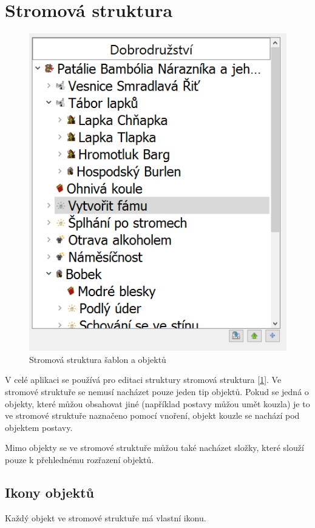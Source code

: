 \documentclass[12pt,a4paper,oneside]{article}
\begin{document}
\section{Stromová struktura}	
	\begin{figure}[h]
  		\centering  		
    		\includegraphics[width=0.8\linewidth]{images/editace_strom}
    		\caption{Stromová struktura šablon a objektů}
    		\label{fig:editace_strom}  	  		
  		\vfill
	\end{figure}	

V celé aplikaci se používá pro editaci struktury stromová struktura [\ref{fig:editace_strom}]. Ve stromové struktuře se nemusí nacházet pouze jeden tip objektů. Pokud se jedná o objekty, které můžou obsahovat jiné (například postavy můžou umět kouzla) je to ve stromové struktuře naznačeno pomocí vnoření, objekt kouzle se nachází pod objektem postavy. \par

Mimo objekty se ve stromové struktuře můžou také nacházet složky, které slouží pouze k přehlednému rozřazení objektů.

\subsection{Ikony objektů}
	Každý objekt ve stromové struktuře má vlastní ikonu. 
	
\end{document}
